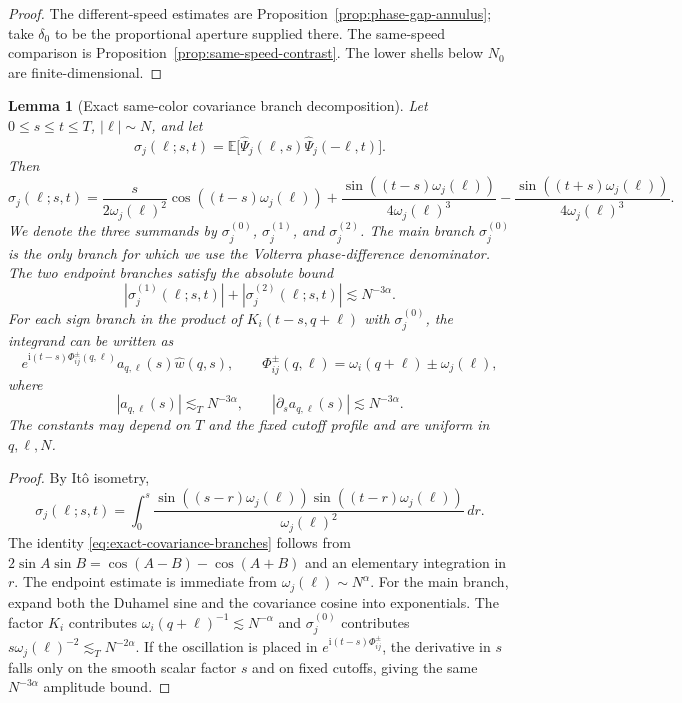 \documentclass[10pt]{amsart}
\numberwithin{equation}{section}
\theoremstyle{plain}
\newtheorem{lemma}[theorem]{Lemma}
\theoremstyle{definition}
\theoremstyle{remark}
\newcommand{\E}{\mathbb{E}}
\newcommand{\ii}{\mathrm{i}}
\begin{document}
\begin{proof}
The different-speed estimates are Proposition~\ref{prop:phase-gap-annulus}; take $\delta_0$ to be the proportional aperture supplied there.  The same-speed comparison is Proposition~\ref{prop:same-speed-contrast}.  The lower shells below $N_0$ are finite-dimensional.
\end{proof}


\begin{lemma}[Exact same-color covariance branch decomposition]\label{lem:exact-covariance-branches}
Let $0\le s\le t\le T$, $|\ell|\sim N$, and let
\[
        \sigma_j(\ell;s,t)=\E\bigl[\widehat\Psi_j(\ell,s)\widehat\Psi_j(-\ell,t)\bigr].
\]
Then
\begin{equation}\label{eq:exact-covariance-branches}
\sigma_j(\ell;s,t)=
\frac{s}{2\omega_j(\ell)^2}\cos((t-s)\omega_j(\ell))
+\frac{\sin((t-s)\omega_j(\ell))}{4\omega_j(\ell)^3}
-\frac{\sin((t+s)\omega_j(\ell))}{4\omega_j(\ell)^3}.
\end{equation}
We denote the three summands by $\sigma_j^{(0)}$, $\sigma_j^{(1)}$, and $\sigma_j^{(2)}$.  The main branch $\sigma_j^{(0)}$ is the only branch for which we use the Volterra phase-difference denominator.  The two endpoint branches satisfy the absolute bound
\begin{equation}\label{eq:endpoint-covariance-absolute}
        |\sigma_j^{(1)}(\ell;s,t)|+|\sigma_j^{(2)}(\ell;s,t)|\lesssim N^{-3\alpha}.
\end{equation}
For each sign branch in the product of $K_i(t-s,q+\ell)$ with $\sigma_j^{(0)}$, the integrand can be written as
\begin{equation}\label{eq:main-covariance-sign-branch}
        e^{\ii(t-s)\Phi_{ij}^{\pm}(q,\ell)}a_{q,\ell}(s)\widehat w(q,s),
        \qquad
        \Phi_{ij}^{\pm}(q,\ell)=\omega_i(q+\ell)\pm\omega_j(\ell),
\end{equation}
where
\begin{equation}\label{eq:main-covariance-amplitude-bounds}
        |a_{q,\ell}(s)|\lesssim_T N^{-3\alpha},
        \qquad
        |\partial_sa_{q,\ell}(s)|\lesssim N^{-3\alpha}.
\end{equation}
The constants may depend on $T$ and the fixed cutoff profile and are uniform in $q,\ell,N$.
\end{lemma}

\begin{proof}
By It\^o isometry,
\[
\sigma_j(\ell;s,t)=\int_0^s
\frac{\sin((s-r)\omega_j(\ell))\sin((t-r)\omega_j(\ell))}{\omega_j(\ell)^2}\,dr.
\]
The identity \eqref{eq:exact-covariance-branches} follows from
$2\sin A\sin B=\cos(A-B)-\cos(A+B)$ and an elementary integration in $r$.
The endpoint estimate is immediate from $\omega_j(\ell)\sim N^\alpha$.  For the main branch, expand both the Duhamel sine and the covariance cosine into exponentials.  The factor $K_i$ contributes $\omega_i(q+\ell)^{-1}\lesssim N^{-\alpha}$ and $\sigma_j^{(0)}$ contributes $s\omega_j(\ell)^{-2}\lesssim_T N^{-2\alpha}$.  If the oscillation is placed in $e^{\ii(t-s)\Phi_{ij}^{\pm}}$, the derivative in $s$ falls only on the smooth scalar factor $s$ and on fixed cutoffs, giving the same $N^{-3\alpha}$ amplitude bound.
\end{proof}
\end{document}
